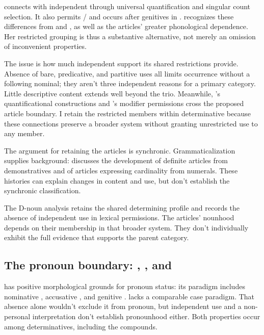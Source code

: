 \documentclass[12pt]{article}
\begin{document}
 connects with independent  through universal quantification and singular count selection. It also permits / and occurs after genitives in . \textcite[156--158]{spinillo2004reconceptualising} recognizes these differences from  and , as well as the articles' greater phonological dependence. Her restricted grouping is thus a substantive alternative, not merely an omission of inconvenient properties.

The issue is how much independent support its shared restrictions provide. Absence of bare, predicative, and partitive uses all limits occurrence without a following nominal; they aren't three independent reasons for a primary category. Little descriptive content extends well beyond the trio. Meanwhile, 's quantificational constructions and 's modifier permissions cross the proposed article boundary. I retain the restricted members within determinative because these connections preserve a broader system without granting unrestricted use to any member.

The argument for retaining the articles is synchronic. Grammaticalization supplies background: \textcite[331--336]{lyons1999} discusses the development of definite articles from demonstratives and of articles expressing cardinality from numerals. These histories can explain changes in content and use, but don't establish the synchronic classification.

The D-noun analysis retains the shared determining profile and records the absence of independent use in lexical permissions. The articles' nounhood depends on their membership in that broader system. They don't individually exhibit the full evidence that supports the parent category.

\subsection{The pronoun boundary: , , and }\label{sec:wh-boundary}

 has positive morphological grounds for pronoun status: its paradigm includes nominative , accusative , and genitive  \citep[904--905]{huddleston2002}.  lacks a comparable case paradigm. That absence alone wouldn't exclude it from pronoun, but independent use and a non-personal interpretation don't establish pronounhood either. Both properties occur among determinatives, including the  compounds.
\end{document}

